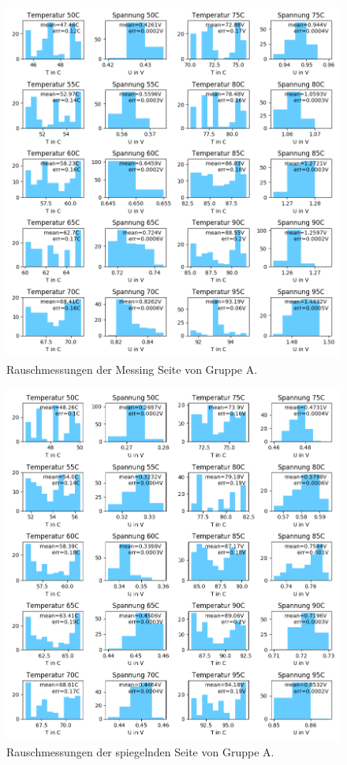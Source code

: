 \documentclass[12pt,a4paper]{article}
\begin{document}
\begin{figure}[H]
\includegraphics[scale=0.8]{Bilder/Rauschen_A_messing_2.png}
\caption{Rauschmessungen der Messing Seite von Gruppe A.}
\end{figure}

\begin{figure}[H]
\includegraphics[scale=0.8]{Bilder/Rauschen_A_spiegel_2.png}
\caption{Rauschmessungen der spiegelnden Seite von Gruppe A.}
\end{figure}
\end{document}
